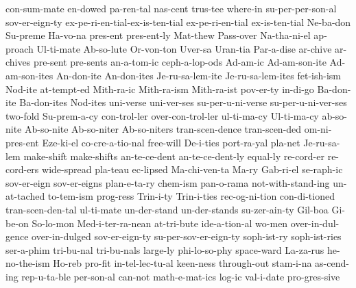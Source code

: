 {con-sum-mate
en-dowed
pa-ren-tal
nas-cent
trus-tee
where-in
su-per-per-son-al
sov-er-eign-ty
ex-pe-ri-en-tial-ex-is-ten-tial
ex-pe-ri-en-tial
ex-is-ten-tial
Ne-ba-don
Su-preme
Ha-vo-na
pres-ent
pres-ent-ly
Mat-thew
Pass-over
Na-tha-ni-el
ap-proach
Ul-ti-mate
Ab-so-lute
Or-von-ton
Uver-sa
Uran-tia
Par-a-dise
ar-chive
ar-chives
pre-sent
pre-sents
an-a-tom-ic
ceph-a-lop-ods
Ad-am-ic
Ad-am-son-ite
Ad-am-son-ites
An-don-ite
An-don-ites
Je-ru-sa-lem-ite
Je-ru-sa-lem-ites
fet-ish-ism
Nod-ite
at-tempt-ed
Mith-ra-ic
Mith-ra-ism
Mith-ra-ist
pov-er-ty
in-di-go
Ba-don-ite
Ba-don-ites
Nod-ites
uni-verse
uni-ver-ses
su-per-u-ni-verse
su-per-u-ni-ver-ses
two-fold
Su-prem-a-cy
con-trol-ler
over-con-trol-ler
ul-ti-ma-cy
Ul-ti-ma-cy
ab-so-nite
Ab-so-nite
Ab-so-niter
Ab-so-niters
tran-scen-dence
tran-scen-ded
om-ni-pres-ent
Eze-ki-el
co-cre-a-tio-nal
free-will
De-i-ties
port-ra-yal
pla-net
Je-ru-sa-lem
make-shift
make-shifts
an-te-ce-dent
an-te-ce-dent-ly
equal-ly
re-cord-er
re-cord-ers
wide-spread
pla-teau
ec-lipsed
Ma-chi-ven-ta
Ma-ry
Gab-ri-el
se-raph-ic
sov-er-eign
sov-er-eigns
plan-e-ta-ry
chem-ism
pan-o-rama
not-with-stand-ing
un-at-tached
to-tem-ism
prog-ress
Trin-i-ty
Trin-i-ties
rec-og-ni-tion
con-di-tioned
tran-scen-den-tal
ul-ti-mate
un-der-stand
un-der-stands
su-zer-ain-ty
Gil-boa
Gi-be-on
So-lo-mon
Med-i-ter-ra-nean
at-tri-bute
ide-a-tion-al
wo-men
over-in-dul-gence
over-in-dulged
sov-er-eign-ty
su-per-sov-er-eign-ty
soph-ist-ry
soph-ist-ries
ser-a-phim
tri-bu-nal
tri-bu-nals
large-ly
phi-lo-so-phy
space-ward
La-za-rus
he-no-the-ism
Ho-reb
pro-fit
in-tel-lec-tu-al
keen-ness
through-out
stam-i-na
as-cend-ing
rep-u-ta-ble
per-son-al
can-not
math-e-mat-ics
log-ic
val-i-date
pro-gres-sive
}
